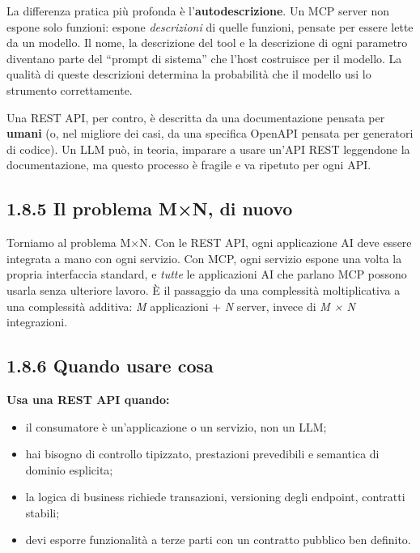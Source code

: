 \documentclass[
  italian,
  10pt,
]{book}
\providecommand{\tightlist}{%
  \setlength{\itemsep}{0pt}\setlength{\parskip}{0pt}}
\begin{document}
La differenza pratica più profonda è l'\textbf{autodescrizione}. Un MCP
server non espone solo funzioni: espone \emph{descrizioni} di quelle
funzioni, pensate per essere lette da un modello. Il nome, la
descrizione del tool e la descrizione di ogni parametro diventano parte
del ``prompt di sistema'' che l'host costruisce per il modello. La
qualità di queste descrizioni determina la probabilità che il modello
usi lo strumento correttamente.

Una REST API, per contro, è descritta da una documentazione pensata per
\textbf{umani} (o, nel migliore dei casi, da una specifica OpenAPI
pensata per generatori di codice). Un LLM può, in teoria, imparare a
usare un'API REST leggendone la documentazione, ma questo processo è
fragile e va ripetuto per ogni API.

\subsection{1.8.5 Il problema M×N, di
nuovo}\label{il-problema-mn-di-nuovo}

Torniamo al problema M×N. Con le REST API, ogni applicazione AI deve
essere integrata a mano con ogni servizio. Con MCP, ogni servizio espone
una volta la propria interfaccia standard, e \emph{tutte} le
applicazioni AI che parlano MCP possono usarla senza ulteriore lavoro. È
il passaggio da una complessità moltiplicativa a una complessità
additiva: \emph{M} applicazioni + \emph{N} server, invece di \emph{M ×
N} integrazioni.

\subsection{1.8.6 Quando usare cosa}\label{quando-usare-cosa}

\textbf{Usa una REST API quando:}

\begin{itemize}
\tightlist
\item
  il consumatore è un'applicazione o un servizio, non un LLM;
\item
  hai bisogno di controllo tipizzato, prestazioni prevedibili e
  semantica di dominio esplicita;
\item
  la logica di business richiede transazioni, versioning degli endpoint,
  contratti stabili;
\item
  devi esporre funzionalità a terze parti con un contratto pubblico ben
  definito.
\end{itemize}
\end{document}
